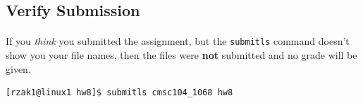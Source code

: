 \documentclass[letter,11pt]{article}
\begin{document}
\subsection*{Verify Submission}
\paragraph{}If you \textit{think} you submitted the assignment, but the \texttt{submitls} command doesn't show you your file names, then the files were \textbf{not} submitted and no grade will be given.
\begin{verbatim}
[rzak1@linux1 hw8]$ submitls cmsc104_1068 hw8
\end{verbatim}
\end{document}
